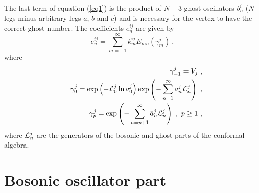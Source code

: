 \documentclass[a4paper,11pt]{article}
\begin{document}
The last term of equation (\ref{eq1}) is the product of $N-3$ ghost oscillators $b^i_n$ ($N$ legs minus arbitrary legs $a$, $b$ and $c$) and is necessary for the vertex to have the correct ghost number. The coefficients $e_n^{ij}$ are given by \cite{ls2}
\begin{equation}
e_n^{ij}=\sum_{m=-1}^\infty k_m^{ij}E_{mn}(\gamma _m^j)\ ,
\end{equation}
where
\begin{eqnarray}
 & & \gamma _{-1}^j=V_j\ ,\\ 
 & & \gamma _0^j=\exp \left( -{\cal L}_0^j\ln a_0^j\right) \exp \left( -\sum_{n=1}^\infty \bar a_n^j{\cal L}_n^j\right) \ ,\\ 
 & & \gamma _p^j=\exp \left( -\sum_{n=p+1}^\infty \bar a_n^j{\cal L}_n^j\right) \ ,\ p\geq 1\ ,
\end{eqnarray}
where ${\cal L}_n^j$ are the generators of the bosonic and ghost parts of the conformal algebra.

\section{Bosonic oscillator part}
\end{document}
